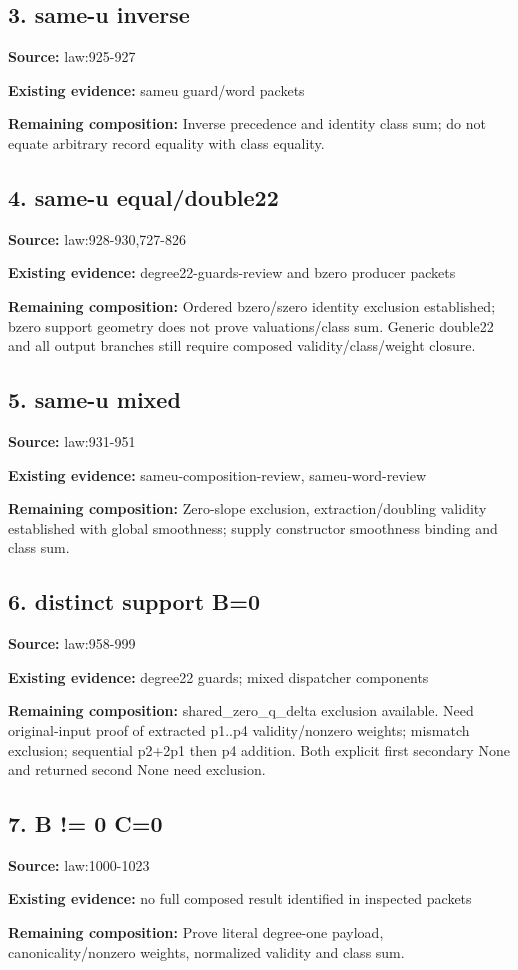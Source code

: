 \documentclass[10pt]{article}
\begin{document}
\subsection*{3. same-u inverse}
\textbf{Source:} law:925-927\par
\textbf{Existing evidence:} sameu guard/word packets\par
\textbf{Remaining composition:} Inverse precedence and identity class sum; do not equate arbitrary record equality with class equality.\par
\subsection*{4. same-u equal/double22}
\textbf{Source:} law:928-930,727-826\par
\textbf{Existing evidence:} degree22-guards-review and bzero producer packets\par
\textbf{Remaining composition:} Ordered bzero/szero identity exclusion established; bzero support geometry does not prove valuations/class sum. Generic double22 and all output branches still require composed validity/class/weight closure.\par
\subsection*{5. same-u mixed}
\textbf{Source:} law:931-951\par
\textbf{Existing evidence:} sameu-composition-review, sameu-word-review\par
\textbf{Remaining composition:} Zero-slope exclusion, extraction/doubling validity established with global smoothness; supply constructor smoothness binding and class sum.\par
\subsection*{6. distinct support B=0}
\textbf{Source:} law:958-999\par
\textbf{Existing evidence:} degree22 guards; mixed dispatcher components\par
\textbf{Remaining composition:} shared\_zero\_q\_delta exclusion available. Need original-input proof of extracted p1..p4 validity/nonzero weights; mismatch exclusion; sequential p2+2p1 then p4 addition. Both explicit first secondary None and returned second None need exclusion.\par
\subsection*{7. B != 0 C=0}
\textbf{Source:} law:1000-1023\par
\textbf{Existing evidence:} no full composed result identified in inspected packets\par
\textbf{Remaining composition:} Prove literal degree-one payload, canonicality/nonzero weights, normalized validity and class sum.\par
\end{document}
